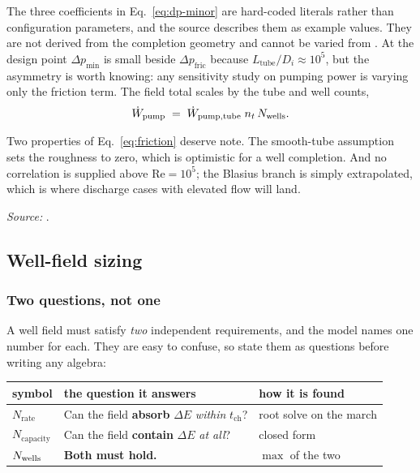 The three coefficients in Eq.~\eqref{eq:dp-minor} are hard-coded literals rather
than configuration parameters, and the source describes them as example values.
They are not derived from the completion geometry and cannot be varied from
. At the design point $\Delta p_{\mathrm{min}}$ is small beside
$\Delta p_{\mathrm{fric}}$ because $L_{\mathrm{tube}}/D_{i}\approx 10^{5}$, but
the asymmetry is worth knowing: any sensitivity study on pumping power is
varying only the friction term.
The field total scales by the tube and well counts,
\begin{equation}
  \dot W_{\mathrm{pump}}
  \;=\;
  \dot W_{\mathrm{pump,tube}}\; n_{t}\,N_{\mathrm{wells}} .
\end{equation}

Two properties of Eq.~\eqref{eq:friction} deserve note. The smooth-tube
assumption sets the roughness to zero, which is optimistic for a well
completion. And no correlation is supplied above $\mathrm{Re}=10^{5}$; the
Blasius branch is simply extrapolated, which is where discharge cases with
elevated flow will land.

\emph{Source:} .

\subsection{Well-field sizing}
\label{sec:hydraulics:sizing}

\subsubsection*{Two questions, not one}
\label{sec:hydraulics:twoq}

A well field must satisfy \emph{two} independent requirements, and the model
names one number for each. They are easy to confuse, so state them as questions
before writing any algebra:

\begin{center}
\begin{tabular}{@{}l l l@{}}
\toprule
symbol & the question it answers & how it is found \\
\midrule
$N_{\mathrm{rate}}$ & Can the field \textbf{absorb} $\Delta E$
                      \emph{within} $t_{\mathrm{ch}}$? & root solve on the march \\
$N_{\mathrm{capacity}}$ & Can the field \textbf{contain} $\Delta E$
                      \emph{at all}? & closed form \\
\midrule
$N_{\mathrm{wells}}$ & \textbf{Both must hold.} & $\max$ of the two \\
\bottomrule
\end{tabular}
\end{center}

